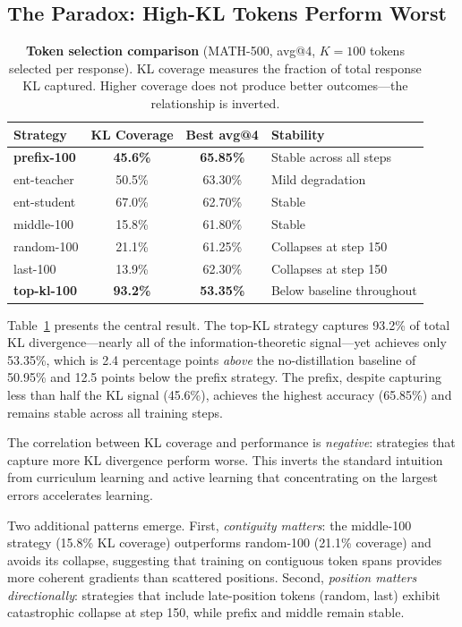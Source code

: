 \subsection{The Paradox: High-KL Tokens Perform Worst}
\label{sec:paradox_result}

\begin{table}[t]
\centering
\caption{\textbf{Token selection comparison} (MATH-500, avg@4, $K{=}100$ tokens selected per response). KL coverage measures the fraction of total response KL captured. Higher coverage does not produce better outcomes---the relationship is inverted.}
\label{tab:token_selection}
\small
\begin{tabular}{@{}lccl@{}}
\toprule
Strategy & KL Coverage & Best avg@4 & Stability \\
\midrule
\textbf{prefix-100}  & \textbf{45.6\%} & \textbf{65.85\%} & Stable across all steps \\
ent-teacher       & 50.5\% & 63.30\% & Mild degradation \\
ent-student       & 67.0\% & 62.70\% & Stable \\
middle-100        & 15.8\% & 61.80\% & Stable \\
random-100        & 21.1\% & 61.25\% & Collapses at step 150 \\
last-100          & 13.9\% & 62.30\% & Collapses at step 150 \\
\textbf{top-kl-100} & \textbf{93.2\%} & \textbf{53.35\%} & Below baseline throughout \\
\bottomrule
\end{tabular}
\end{table}

Table~\ref{tab:token_selection} presents the central result.
The top-KL strategy captures 93.2\% of total KL divergence---nearly all of the information-theoretic signal---yet achieves only 53.35\%, which is 2.4 percentage points \emph{above} the no-distillation baseline of 50.95\% and 12.5 points below the prefix strategy.
The prefix, despite capturing less than half the KL signal (45.6\%), achieves the highest accuracy (65.85\%) and remains stable across all training steps.

The correlation between KL coverage and performance is \emph{negative}: strategies that capture more KL divergence perform worse.
This inverts the standard intuition from curriculum learning and active learning that concentrating on the largest errors accelerates learning.

Two additional patterns emerge.
First, \emph{contiguity matters}: the middle-100 strategy (15.8\% KL coverage) outperforms random-100 (21.1\% coverage) and avoids its collapse, suggesting that training on contiguous token spans provides more coherent gradients than scattered positions.
Second, \emph{position matters directionally}: strategies that include late-position tokens (random, last) exhibit catastrophic collapse at step 150, while prefix and middle remain stable.

